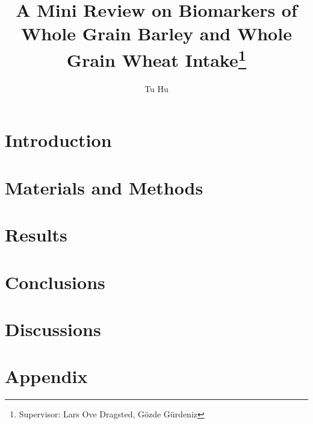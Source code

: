 \documentclass[]{article}
\title{A Mini Review on Biomarkers of Whole Grain Barley and Whole Grain Wheat Intake\footnote{Supervisor: Lars Ove Dragsted, Gözde Gürdeniz}}
\author{Tu Hu}
\begin{document}
\maketitle

\begin{abstract}

\end{abstract}

\section{Introduction}


\section{Materials and Methods}


\section{Results}


\section{Conclusions}

\section{Discussions}


\section{Appendix}


\clearpage
\printbibliography[
heading=bibintoc,
title={References}
]
\end{document}
